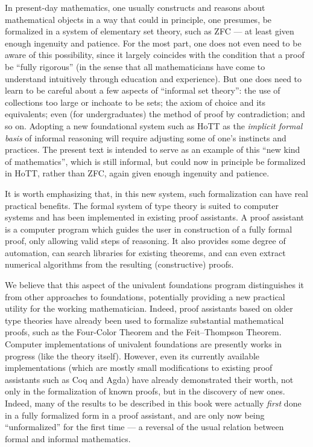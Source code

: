 In present-day mathematics, one usually constructs and reasons about mathematical objects in a way that could in principle, one presumes, be formalized in a system of elementary set theory, such as ZFC --- at least given enough ingenuity and patience.
For the most part, one does not even need to be aware of this possibility, since it largely coincides with the condition that a proof be ``fully rigorous'' (in the sense that all mathematicians have come to understand intuitively through education and experience).
But one does need to learn to be careful about a few aspects of ``informal set theory'': the use of collections too large or inchoate to be sets; the axiom of choice and its equivalents; even (for undergraduates) the method of proof by contradiction; and so on.
Adopting a new foundational system such as HoTT as the \emph{implicit formal basis} of informal reasoning will require adjusting some of one's instincts and practices.
The present text is intended to serve as an example of this ``new kind of mathematics'', which is still informal, but could now in principle be formalized in HoTT, rather than ZFC, again given enough ingenuity and patience.

It is worth emphasizing that, in this new system, such formalization can have real practical benefits.
The formal system of type theory is suited to computer systems and has been implemented in existing proof assistants.
A proof assistant is a computer program which guides the user in construction of a fully formal proof, only allowing valid steps of reasoning.
It also provides some degree of automation, can search libraries for existing theorems, and can even extract numerical algorithms from the resulting (constructive) proofs.

We believe that this aspect of the univalent foundations program distinguishes it from other approaches to foundations, potentially providing a new practical utility for the working mathematician.
Indeed, proof assistants based on older type theories have already been used to formalize substantial mathematical proofs, such as the Four-Color Theorem and the Feit--Thompson Theorem.
Computer implementations of univalent foundations are presently works in progress (like the theory itself).
However, even its currently available implementations (which are mostly small modifications to existing proof assistants such as Coq and Agda) have already demonstrated their worth, not only in the formalization of known proofs, but in the discovery of new ones.
Indeed, many of the results to be described in this book were actually \emph{first} done in a fully formalized form in a proof assistant, and are only now being ``unformalized'' for the first time --- a reversal of the usual relation between formal and informal mathematics.

